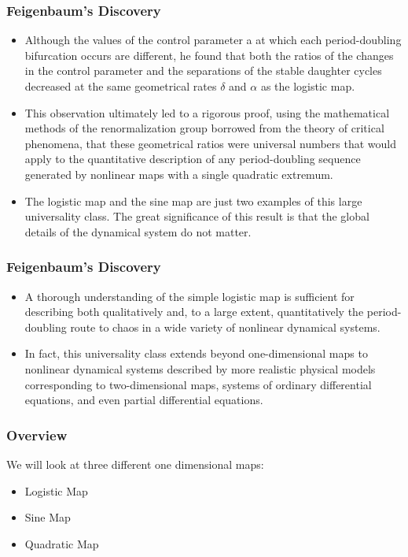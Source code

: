 \documentclass[
	11pt, %
	aspectratio=169, %
]{beamer}
\begin{document}
\begin{frame}
	\frametitle{Feigenbaum's Discovery}
	
	\begin{itemize}
        \item  Although the values of the control parameter a at which each period-doubling bifurcation occurs are different, he found that both the ratios of the changes in the control parameter and the separations of the stable daughter cycles decreased at the same geometrical rates $\delta$ and $\alpha$ as the logistic map. \pause
        \item This observation ultimately led to a rigorous proof, using the mathematical methods of the renormalization group borrowed from the theory of critical phenomena, that these geometrical ratios were universal numbers that would apply to the quantitative description of any period-doubling sequence generated by nonlinear maps with a single quadratic extremum. \pause
        \item The logistic map and the sine map are just two examples of this large universality class. The great significance of this result is that the global details of the dynamical system do not matter.
    \end{itemize}

\end{frame}


\begin{frame}
	\frametitle{Feigenbaum's Discovery}
	
	\begin{itemize}
        \item A thorough understanding of the simple logistic map is sufficient for describing both qualitatively and, to a large extent, quantitatively the period-doubling route to chaos in a wide variety of nonlinear dynamical systems. \pause
        \item In fact, this universality class extends beyond one-dimensional maps to nonlinear dynamical systems described by more realistic physical models corresponding to two-dimensional maps, systems of ordinary differential equations, and even partial differential equations.
    \end{itemize}

\end{frame}


\begin{frame}
	\frametitle{Overview}

    We will look at three different one dimensional maps: \pause

    \begin{itemize}
        \item Logistic Map \pause
        \item Sine Map \pause
        \item Quadratic Map
    \end{itemize}

\end{frame}
\end{document}
